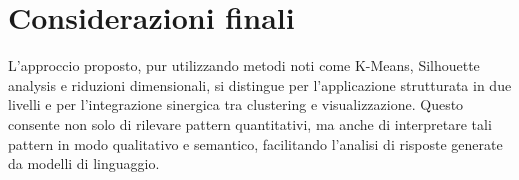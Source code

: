 \documentclass[a4paper,11pt]{article}
\begin{document}
\section{Considerazioni finali}

L’approccio proposto, pur utilizzando metodi noti come K-Means, Silhouette analysis e riduzioni dimensionali, si distingue per l’applicazione strutturata in due livelli e per l’integrazione sinergica tra clustering e visualizzazione. Questo consente non solo di rilevare pattern quantitativi, ma anche di interpretare tali pattern in modo qualitativo e semantico, facilitando l’analisi di risposte generate da modelli di linguaggio.
\end{document}
